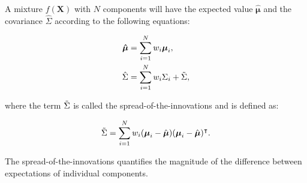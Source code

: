 A mixture $f(\mathbf{X})$ with $N$ components will have the expected value $\boldsymbol{\hat{\mu}}$ and the covariance $\hat{\Sigma}$ according to the following equations:

\begin{align}
    \boldsymbol{\hat{\mu}} &= \sum_{i=1}^N w_i \boldsymbol{\mu}_i, \\
    \hat{\Sigma} &= \sum_{i=1}^N w_i \Sigma_i + \Tilde{\Sigma},
\end{align}

\noindent where the term $\Tilde{\Sigma}$ is called the spread-of-the-innovations and is defined as:

\begin{equation}
    \Tilde{\Sigma}= \sum_{i=1}^N
        w_i (\boldsymbol{\mu}_i - \hat{\boldsymbol{\mu}})
        (\boldsymbol{\mu}_i - \hat{\boldsymbol{\mu}})^\intercal.
\end{equation}

The spread-of-the-innovations quantifies the magnitude of the difference between expectations of individual components.
